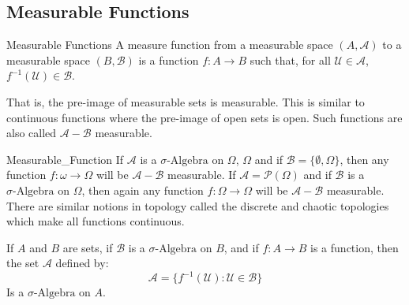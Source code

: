             \subsection{Measurable Functions}
                \begin{ldefinition}{Measurable Functions}
                    A measure function from a measurable space
                    $(A,\mathcal{A})$ to a measurable space
                    $(B,\mathcal{B})$ is a function $f:A\rightarrow{B}$
                    such that, for all $\mathcal{U}\in\mathcal{A}$,
                    $f^{-1}(\mathcal{U})\in\mathcal{B}$.
                \end{ldefinition}
                That is, the pre-image of measurable sets is measurable.
                This is similar to continuous functions where the pre-image
                of open sets is open. Such functions are also called
                $\mathcal{A}-\mathcal{B}$ measurable.
                \begin{lexample}{}{Measurable_Function}
                    If $\mathcal{A}$ is a $\sigma\text{-Algebra}$ on $\Omega$,
                    $\Omega$ and if $\mathcal{B}=\{\emptyset,\Omega\}$,
                    then any function $f:\omega\rightarrow\Omega$ will be
                    $\mathcal{A}-\mathcal{B}$ measurable. If
                    $\mathcal{A}=\mathcal{P}(\Omega)$ and if
                    $\mathcal{B}$ is a $\sigma\text{-Algebra}$ on $\Omega$,
                    then again any function $f:\Omega\rightarrow\Omega$ will
                    be $\mathcal{A}-\mathcal{B}$ measurable. There are similar
                    notions in topology called the discrete and chaotic
                    topologies which make all functions continuous.
                \end{lexample}
                \begin{theorem}
                    If $A$ and $B$ are sets, if $\mathcal{B}$ is a
                    $\sigma\text{-Algebra}$ on $B$, and if $f:A\rightarrow{B}$
                    is a function, then the set $\mathcal{A}$ defined by:
                    \begin{equation}
                        \mathcal{A}=
                        \{f^{-1}(\mathcal{U}):\mathcal{U}\in\mathcal{B}\}
                    \end{equation}
                    Is a $\sigma\text{-Algebra}$ on $A$.
                \end{theorem}
